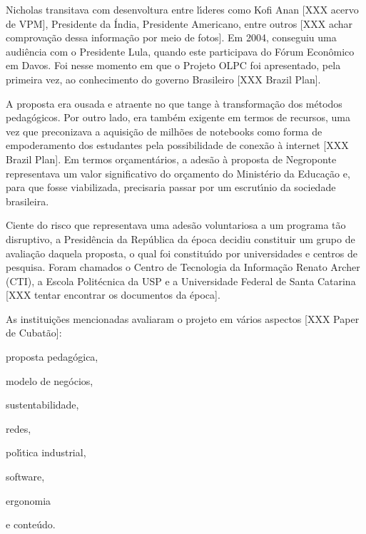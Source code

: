 \documentclass[
12pt,		%
openright,	%
twoside,  %
a4paper,			%
chapter=TITLE,		%
english,			%
french,				%
spanish,			%
brazil				%
]{USPSC-classe/USPSC_RedarTex}
\begin{document}
Nicholas transitava com desenvoltura entre l\'{\i}deres como Kofi Anan [XXX acervo de VPM], Presidente da \'India, Presidente Americano, entre outros [XXX achar comprova\c{c}\~ao dessa informa\c{c}\~ao por meio de fotos]. Em 2004, conseguiu uma audi\^encia com o Presidente Lula, quando este participava do F\'orum  Econ\^omico  em Davos. Foi nesse momento em que o Projeto OLPC foi apresentado, pela primeira vez, ao conhecimento do governo Brasileiro [XXX Brazil Plan].








A proposta era ousada e atraente no que tange \`a transforma\c{c}\~ao dos m\'etodos pedag\'ogicos. Por outro lado, era tamb\'em exigente em termos de recursos, uma vez que preconizava a aquisi\c{c}\~ao de milh\~oes de notebooks como forma de empoderamento dos estudantes pela possibilidade de conex\~ao \`a internet [XXX Brazil Plan]. Em termos or\c{c}ament\'arios, a ades\~ao \`a proposta de Negroponte representava um valor significativo do or\c{c}amento do Minist\'erio da Educa\c{c}\~ao e, para que fosse viabilizada, precisaria passar por um escrut\'{\i}nio da sociedade brasileira.








Ciente do risco que representava uma ades\~ao voluntariosa a um programa t\~ao disruptivo, a Presid\^encia da Rep\'ublica da \'epoca decidiu constituir um grupo de avalia\c{c}\~ao  daquela proposta, o  qual foi constitu\'{\i}do por universidades e centros de pesquisa. Foram chamados o Centro de Tecnologia da Informa\c{c}\~ao Renato Archer (CTI), a Escola Polit\'ecnica da USP e a Universidade Federal de Santa Catarina [XXX tentar encontrar os documentos da \'epoca]. 








As institui\c{c}\~oes mencionadas avaliaram o projeto em v\'arios aspectos [XXX Paper de Cubat\~ao]:









\begin{alineas}
\item proposta pedag\'ogica,
\item modelo de neg\'ocios,
\item sustentabilidade,
\item redes,
\item pol\'{\i}tica industrial,
\item software,
\item ergonomia
\item e conte\'udo.
\end{alineas}
\end{document}
